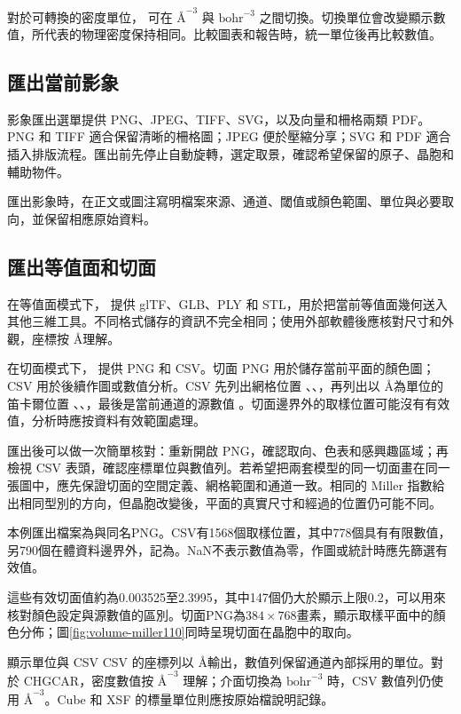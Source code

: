 對於可轉換的密度單位， 可在 $\text{\AA}^{-3}$ 與 $\mathrm{bohr}^{-3}$ 之間切換。切換單位會改變顯示數值，所代表的物理密度保持相同。比較圖表和報告時，統一單位後再比較數值。

\subsection{匯出當前影象}

影象匯出選單提供 PNG、JPEG、TIFF、SVG，以及向量和柵格兩類 PDF。PNG 和 TIFF 適合保留清晰的柵格圖；JPEG 便於壓縮分享；SVG 和 PDF 適合插入排版流程。匯出前先停止自動旋轉，選定取景，確認希望保留的原子、晶胞和輔助物件。

匯出影象時，在正文或圖注寫明檔案來源、通道、閾值或顏色範圍、單位與必要取向，並保留相應原始資料。

\subsection{匯出等值面和切面}

在等值面模式下， 提供 glTF、GLB、PLY 和 STL，用於把當前等值面幾何送入其他三維工具。不同格式儲存的資訊不完全相同；使用外部軟體後應核對尺寸和外觀，座標按 \AA 理解。

在切面模式下， 提供 PNG 和 CSV。切面 PNG 用於儲存當前平面的顏色圖；CSV 用於後續作圖或數值分析。CSV 先列出網格位置 、、，再列出以 \AA 為單位的笛卡爾位置 \mbox{}、\mbox{}、\mbox{}，最後是當前通道的源數值 。切面邊界外的取樣位置可能沒有有效值，分析時應按資料有效範圍處理。

匯出後可以做一次簡單核對：重新開啟 PNG，確認取向、色表和感興趣區域；再檢視 CSV 表頭，確認座標單位與數值列。若希望把兩套模型的同一切面畫在同一張圖中，應先保證切面的空間定義、網格範圍和通道一致。相同的 Miller 指數給出相同型別的方向，但晶胞改變後，平面的真實尺寸和經過的位置仍可能不同。

本例匯出檔案為與同名PNG。CSV有1568個取樣位置，其中778個具有有限數值，另790個在體資料邊界外，記為。NaN不表示數值為零，作圖或統計時應先篩選有效值。

這些有效切面值約為0.003525至2.3995，其中147個仍大於顯示上限0.2，可以用來核對顏色設定與源數值的區別。切面PNG為$384\times768$畫素，顯示取樣平面中的顏色分佈；圖\ref{fig:volume-miller110}同時呈現切面在晶胞中的取向。

\begin{notebox}{顯示單位與 CSV}
CSV 的座標列以 \AA 輸出，數值列保留通道內部採用的單位。對於 \mbox{CHGCAR}，密度數值按 $\text{\AA}^{-3}$ 理解；介面切換為 $\mathrm{bohr}^{-3}$ 時，CSV 數值列仍使用 $\text{\AA}^{-3}$。Cube 和 XSF 的標量單位則應按原始檔說明記錄。
\end{notebox}

